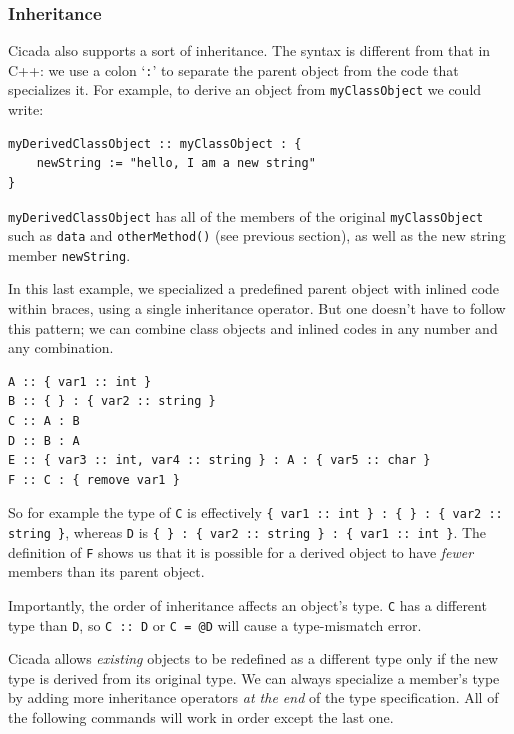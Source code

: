\documentclass{article}
\newenvironment{code}{
       \begin{list}{}{
               \setlength{\leftmargin}{.4in}
               \setlength{\rightmargin}{0in}
               \setlength{\topsep}{.2in}
       }
       \small
       \item[] }
       { \end{list}   }
\begin{document}


\subsubsection{Inheritance}

Cicada also supports a sort of inheritance.  The syntax is different from that in C++:  we use a colon `\verb#:#' to separate the parent object from the code that specializes it.  For example, to derive an object from \verb#myClassObject# we could write:

\begin{code} \begin{verbatim}
myDerivedClassObject :: myClassObject : {
    newString := "hello, I am a new string"
}
\end{verbatim} \end{code}

\noindent \verb#myDerivedClassObject# has all of the members of the original \verb#myClassObject# such as \verb#data# and \verb#otherMethod()# (see previous section), as well as the new string member \verb#newString#.

In this last example, we specialized a predefined parent object with inlined code within braces, using a single inheritance operator.  But one doesn't have to follow this pattern; we can combine class objects and inlined codes in any number and any combination.

\begin{code} \begin{verbatim}
A :: { var1 :: int }
B :: { } : { var2 :: string }
C :: A : B
D :: B : A
E :: { var3 :: int, var4 :: string } : A : { var5 :: char }
F :: C : { remove var1 }
\end{verbatim} \end{code}

\noindent So for example the type of \verb#C# is effectively \verb#{ var1 :: int } : { } : { var2 :: string }#, whereas \verb#D# is \verb#{ } : { var2 :: string } : { var1 :: int }#.  The definition of \verb#F# shows us that it is possible for a derived object to have \emph{fewer} members than its parent object.

Importantly, the order of inheritance affects an object's type.  \verb#C# has a different type than \verb#D#, so \verb#C :: D# or \verb#C = @D# will cause a type-mismatch error.

Cicada allows \emph{existing} objects to be redefined as a different type only if the new type is derived from its original type.  We can always specialize a member's type by adding more inheritance operators \emph{at the end} of the type specification.  All of the following commands will work in order except the last one.
\end{document}
